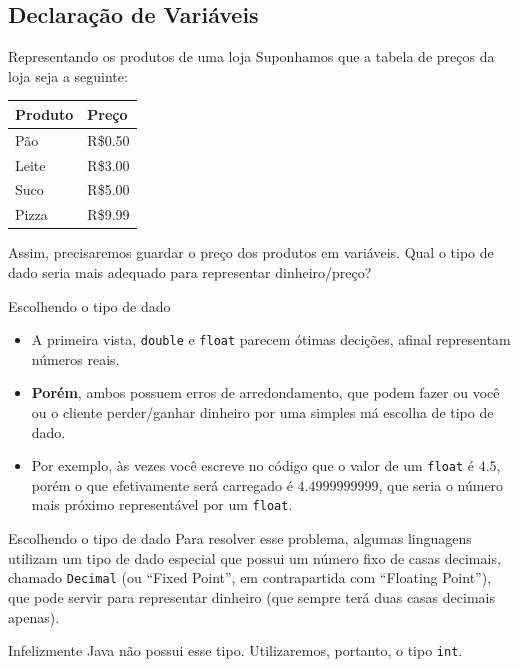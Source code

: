 \documentclass{beamer}
\begin{document}
\subsection{Declaração de Variáveis}

\begin{frame}{Representando os produtos de uma loja}
    Suponhamos que a tabela de preços da loja seja a seguinte:

    \begin{center}
        \begin{tabular}{|l|l|}
            \hline Produto & Preço \\ \hline
            Pão   & R\$0.50 \\
            Leite & R\$3.00 \\
            Suco  & R\$5.00 \\
            Pizza & R\$9.99 \\
            \hline
        \end{tabular}
    \end{center}

    Assim, precisaremos guardar o preço dos produtos em variáveis.
    Qual o tipo de dado seria mais adequado para representar dinheiro/preço?
\end{frame}

\begin{frame}{Escolhendo o tipo de dado}
    \begin{itemize}
        \item A primeira vista, \texttt{double} e \texttt{float} parecem ótimas
            decições, afinal representam números reais.
        \item \textbf{Porém}, ambos possuem erros de arredondamento, que podem
            fazer ou você ou o cliente perder/ganhar dinheiro por uma simples
            má escolha de tipo de dado.
        \item Por exemplo, às vezes você escreve no código que o valor de um
            \texttt{float} é $4.5$, porém o que efetivamente será carregado é
            $4.4999999999$, que seria o número mais próximo representável por
            um \texttt{float}.
    \end{itemize}
\end{frame}

\begin{frame}{Escolhendo o tipo de dado}
    Para resolver esse problema, algumas linguagens utilizam um tipo de dado
    especial que possui um número fixo de casas decimais, chamado
    \texttt{Decimal} (ou ``Fixed Point'', em contrapartida com ``Floating Point''),
    que pode servir para representar dinheiro (que sempre terá duas casas
    decimais apenas).

    Infelizmente Java não possui esse tipo. Utilizaremos, portanto, o tipo
    \texttt{int}.
\end{frame}
\end{document}
